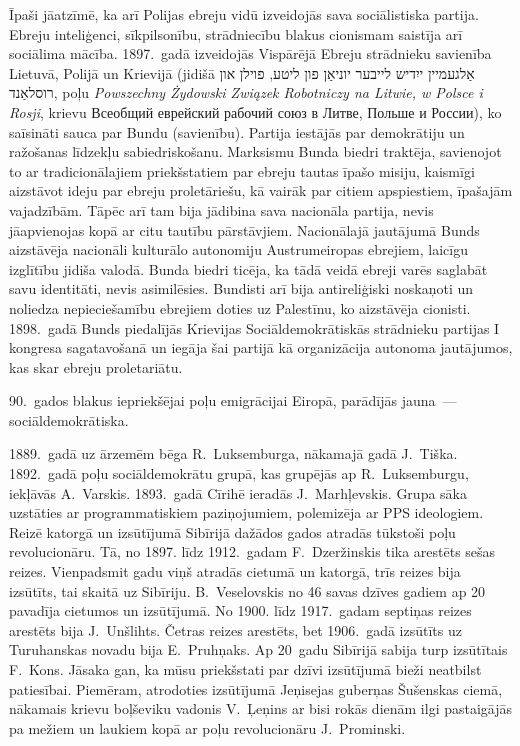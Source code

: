 \documentclass[twoside,a5paper,12pt,fleqn,openany]{extbook}
\newcommand{\pltxti}[1]{\textit{\textpolish{#1}}}
\newcommand{\rutxti}[1]{\textrussian{#1}}
\newcommand{\hetxti}[1]{\texthebrew{#1}}
\begin{document}
Īpaši jāatzīmē, ka arī Polijas ebreju vidū izveidojās sava sociālistiska partija. Ebreju inteliģenci, sīkpilsonību, strādniecību blakus cionismam saistīja arī sociālima mācība. 1897.~gadā izveidojās Vispārējā Ebreju strādnieku savienība Lietuvā, Polijā un Krievijā (jidišā \hetxti{אַלגעמיין ייִדיש לייבער יוניאַן פון ליטע, פוילן און רוסלאַנד}, poļu \pltxti{Powszechny Żydowski Związek Robotniczy na Litwie, w Polsce i Rosji}, krievu \rutxti{Всеобщий еврейский рабочий союз в Литве, Польше и России}), ko saīsināti sauca par Bundu (savienību). Partija iestājās par demokrātiju un ražošanas līdzekļu sabiedriskošanu. Marksismu Bunda biedri traktēja, savienojot to ar tradicionālajiem priekšstatiem par ebreju tautas īpašo misiju, kaismīgi aizstāvot ideju par ebreju proletāriešu, kā vairāk par citiem apspiestiem, īpašajām vajadzībām. Tāpēc arī tam bija jādibina sava nacionāla partija, nevis jāapvienojas kopā ar citu tautību pārstāvjiem. Nacionālajā jautājumā Bunds aizstāvēja nacionāli kulturālo autonomiju Austrumeiropas ebrejiem, laicīgu izglītību jidiša valodā. Bunda biedri ticēja, ka tādā veidā ebreji varēs saglabāt savu identitāti, nevis asimilēsies. Bundisti arī bija antireliģiski noskaņoti un noliedza nepieciešamību ebrejiem doties uz Palestīnu, ko aizstāvēja cionisti. 1898.~gadā Bunds piedalījās Krievijas Sociāldemokrātiskās strādnieku partijas I kongresa sagatavošanā un iegāja šai partijā kā organizācija autonoma jautājumos, kas skar ebreju proletariātu.

90.~gados blakus iepriekšējai poļu emigrācijai Eiropā, parādījās jauna~--- sociāldemokrātiska.

1889.~gadā uz ārzemēm bēga R.~Luksemburga, nākamajā gadā J.~Tiška. 1892.~gadā poļu sociāldemokrātu grupā, kas grupējās ap R.~Luksemburgu, iekļāvās A.~Varskis. 1893.~gadā Cīrihē ieradās J.~Marhļevskis. Grupa sāka uzstāties ar programmatiskiem paziņojumiem, polemizēja ar PPS ideologiem. Reizē katorgā un izsūtījumā Sibīrijā dažādos gados atradās tūkstoši poļu revolucionāru. Tā, no 1897. līdz 1912.~gadam F.~Dzeržinskis tika arestēts sešas reizes. Vienpadsmit gadu viņš atradās cietumā un katorgā, trīs reizes bija izsūtīts, tai skaitā uz Sibīriju. B.~Veselovskis no 46 savas dzīves gadiem ap 20 pavadīja cietumos un izsūtījumā. No 1900. līdz 1917.~gadam septiņas reizes arestēts bija J.~Unšlihts. Četras reizes arestēts, bet 1906.~gadā izsūtīts uz Turuhanskas novadu bija E.~Pruhņaks. Ap 20~gadu Sibīrijā sabija turp izsūtītais F.~Kons. Jāsaka gan, ka mūsu priekšstati par dzīvi izsūtījumā bieži neatbilst patiesībai. Piemēram, atrodoties izsūtījumā Jeņisejas guberņas Šušenskas ciemā, nākamais krievu boļševiku vadonis V.~Ļeņins ar bisi rokās dienām ilgi pastaigājās pa mežiem un laukiem kopā ar poļu revolucionāru J.~Prominski.
\end{document}
